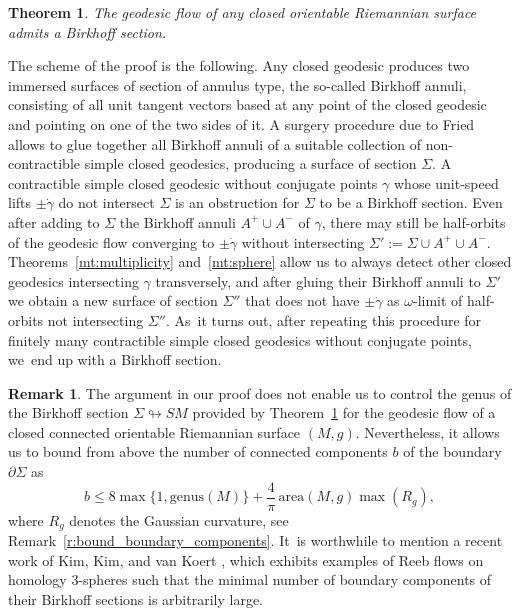 \documentclass[JEP,XML,SOM,Unicode,NoFloatCountersInSection,published]{cedram}
\newcommand{\area}{\mathrm{area}}
\theoremstyle{plain}
\newtheorem{MainThm}{Theorem}
\theoremstyle{definition}
\newtheorem{Remark}[Thm]{Remark}
\begin{document}
\begin{MainThm}\label{mt:Birkhoff_sections}
The geodesic flow of any closed orientable Riemannian surface admits a Birkhoff section.
\end{MainThm}

The scheme of the proof is the following. Any closed geodesic produces two immersed surfaces of section of annulus type, the so-called Birkhoff annuli, consisting of all unit tangent vectors based at any point of the closed geodesic and pointing on one of the two sides of it. A surgery procedure due to Fried \cite{Fried:1983aa} allows to glue together all Birkhoff annuli of a suitable collection of non-contractible simple closed geodesics, producing a surface of section $\Sigma$. A contractible simple closed geodesic without conjugate points $\gamma$ whose unit-speed lifts $\pm\dot\gamma$ do not intersect $\Sigma$ is an obstruction for $\Sigma$ to be a Birkhoff section. Even after adding to $\Sigma$ the Birkhoff annuli $A^+\cup A^-$ of $\gamma$, there may still be half-orbits of the geodesic flow converging to $\pm\dot\gamma$ without intersecting $\Sigma':=\Sigma\cup A^+\cup A^-$. Theorems~\ref{mt:multiplicity} and~\ref{mt:sphere} allow us to always detect other closed geodesics intersecting $\gamma$ transversely, and after gluing their Birkhoff annuli to $\Sigma'$ we obtain a new surface of section $\Sigma''$ that does not have $\pm\dot\gamma$ as $\omega$-limit of half-orbits not intersecting $\Sigma''$. As~it turns out, after repeating this procedure for finitely many contractible simple closed geodesics without conjugate points, we~end up with a Birkhoff section.

\begin{Remark}
The argument in our proof does not enable us to control the genus of the Birkhoff section $\Sigma\looparrowright SM$ provided by Theorem~\ref{mt:Birkhoff_sections} for the geodesic flow of a closed connected orientable Riemannian surface $(M,g)$. Nevertheless, it allows us to bound from above the number of connected components $b$ of the boundary $\partial\Sigma$ as
\[
 b\leq 8\max\big\{1,\mathrm{genus}(M)\big\}+\frac{4}{\pi}\,\area(M,g)\max(R_g),
\]
where $R_g$ denotes the Gaussian curvature, see Remark~\ref{r:bound_boundary_components}. It~is worthwhile to mention a recent work of Kim, Kim, and van Koert \cite{Kim:2022aa}, which exhibits examples of Reeb flows on homology 3-spheres such that the minimal number of boundary components of their Birkhoff sections is arbitrarily large.
\end{Remark}
\end{document}
